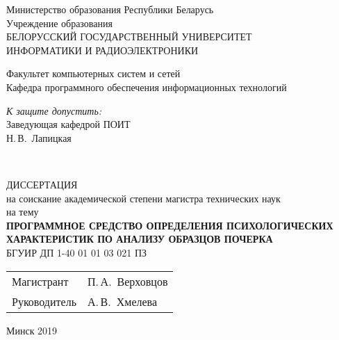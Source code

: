 \begin{titlepage}
  \begin{center}
    Министерство образования Республики Беларусь\\[1em]
    Учреждение образования\\
    БЕЛОРУССКИЙ ГОСУДАРСТВЕННЫЙ УНИВЕРСИТЕТ \\
    ИНФОРМАТИКИ И РАДИОЭЛЕКТРОНИКИ\\[1em]

    \begin{flushleft}
        Факультет компьютерных систем и сетей\\
        Кафедра программного обеспечения информационных технологий
    \end{flushleft}

    \begin{flushright}
      \begin{minipage}{0.4\textwidth}
        \textit{К защите допустить:}\\[0.8 em]
        Заведующая кафедрой ПОИТ\\[0.45 em]
        \underline{\hspace*{2.8 cm}} Н.\,В.~Лапицкая
      \end{minipage}\\[2.2 em]
    \end{flushright}


    {ДИССЕРТАЦИЯ}\\
    {на соискание академической степени магистра технических наук}\\
    {на тему}\\[1em]
    \textbf{ПРОГРАММНОЕ СРЕДСТВО ОПРЕДЕЛЕНИЯ ПСИХОЛОГИЧЕСКИХ ХАРАКТЕРИСТИК ПО АНАЛИЗУ ОБРАЗЦОВ ПОЧЕРКА}\\[1em]


    {БГУИР ДП 1-40 01 01 03 021 ПЗ}\\[2em]

    \begin{tabular}{ p{}p{} }
      Магистрант & П.\,А.~Верховцов \\
      Руководитель & А.\,В.~Хмелева \\
    \end{tabular}

    \vfill
    {\normalsize Минск 2019}
  \end{center}
\end{titlepage}
